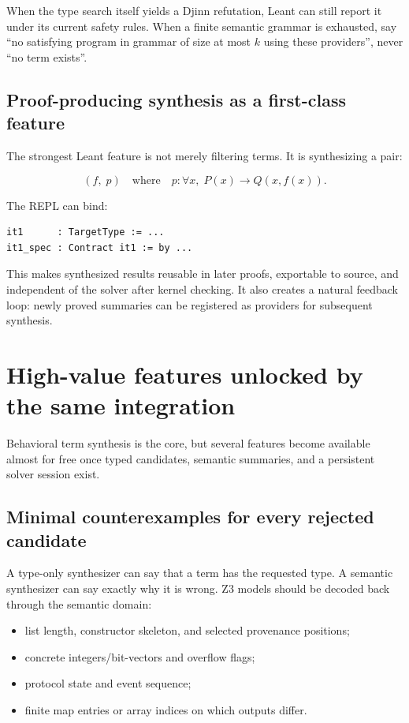 \documentclass[11pt,oneside]{article}
\begin{document}
When the type search itself yields a Djinn refutation, Leant can still report it under
its current safety rules. When a finite semantic grammar is exhausted, say
``no satisfying program in grammar of size at most $k$ using these providers'', never
``no term exists''.

\subsection{Proof-producing synthesis as a first-class feature}

The strongest Leant feature is not merely filtering terms. It is synthesizing a pair:

\[
  (f,\;p) \quad\text{where}\quad p : \forall x,\;P(x)\to Q(x,f(x)).
\]

The REPL can bind:

\begin{lstlisting}[language=Lean]
it1      : TargetType := ...
it1_spec : Contract it1 := by ...
\end{lstlisting}

This makes synthesized results reusable in later proofs, exportable to source, and
independent of the solver after kernel checking. It also creates a natural feedback
loop: newly proved summaries can be registered as providers for subsequent synthesis.


\section{High-value features unlocked by the same integration}

Behavioral term synthesis is the core, but several features become available almost
for free once typed candidates, semantic summaries, and a persistent solver session
exist.

\subsection{Minimal counterexamples for every rejected candidate}

A type-only synthesizer can say that a term has the requested type. A semantic
synthesizer can say exactly why it is wrong. Z3 models should be decoded back through
the semantic domain:

\begin{itemize}
  \item list length, constructor skeleton, and selected provenance positions;
  \item concrete integers/bit-vectors and overflow flags;
  \item protocol state and event sequence;
  \item finite map entries or array indices on which outputs differ.
\end{itemize}
\end{document}

